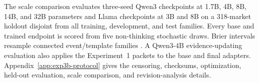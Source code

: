 The scale comparison evaluates three-seed Qwen3 checkpoints at 1.7B, 4B, 8B, 14B, and
32B parameters and Llama checkpoints at 3B and 8B on a 318-market holdout disjoint
from all training, development, and test families. Every base and trained endpoint is
scored from five non-thinking stochastic draws. Brier intervals resample connected
event/template families \citep{brier1950verification,good1952rational}. A Qwen3-4B
evidence-updating evaluation also applies the Experiment~1 packets to the base and
final adapters. Appendix~\ref{app:exp3b-protocol} gives the censoring, checksums,
optimization, held-out evaluation, scale comparison, and revision-analysis details.
